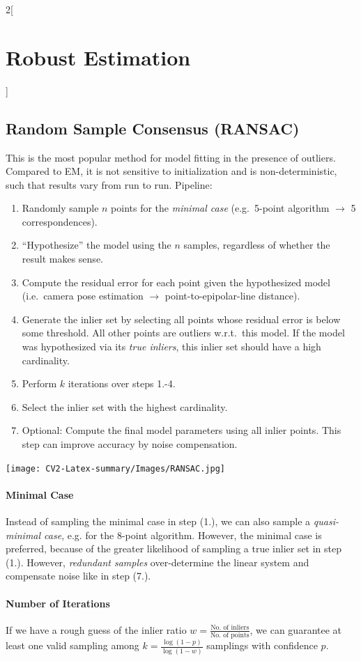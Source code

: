\documentclass[oneside,fontsize=11pt,paper=a4]{scrartcl}
\begin{document}
\begin{multicols}{2}[\section{Robust Estimation}]
\subsection{Random Sample Consensus (RANSAC)}

This is the most popular method for model fitting in the presence of outliers. Compared to EM, it is not sensitive to initialization and is non-deterministic, such that results vary from run to run. Pipeline:
\begin{enumerate}
    \item Randomly sample $n$ points for the \textit{minimal case} (e.g.\ 5-point algorithm $\rightarrow$ 5 correspondences).
    \item ``Hypothesize'' the model using the $n$ samples, regardless of whether the result makes sense.
    \item Compute the residual error for each point given the hypothesized model (i.e.\ camera pose estimation $\rightarrow$ point-to-epipolar-line distance).
    \item Generate the inlier set by selecting all points whose residual error is below some threshold. All other points are outliers w.r.t.\ this model. If the model was hypothesized via its \textit{true inliers}, this inlier set should have a high cardinality.
    \item Perform $k$ iterations over steps 1.-4.
    \item Select the inlier set with the highest cardinality.
    \item Optional: Compute the final model parameters using all inlier points. This step can improve accuracy by noise compensation.
\end{enumerate}
\begin{center}
    \texttt{[image: CV2-Latex-summary/Images/RANSAC.jpg]}
\end{center}

\paragraph{Minimal Case} Instead of sampling the minimal case in step (1.), we can also sample a \textit{quasi-minimal case}, e.g. for the 8-point algorithm. However, the minimal case is preferred, because of the greater likelihood of sampling a true inlier set in step (1.). However, \textit{redundant samples} over-determine the linear system and compensate noise like in step (7.).

\paragraph{Number of Iterations} If we have a rough guess of the inlier ratio $w=\frac{\text{No. of inliers}}{\text{No. of points}}$, we can guarantee at least one valid sampling among $k = \frac{\log(1-p)}{\log(1-w)}$ samplings with confidence $p$.


\end{multicols}
\end{document}
